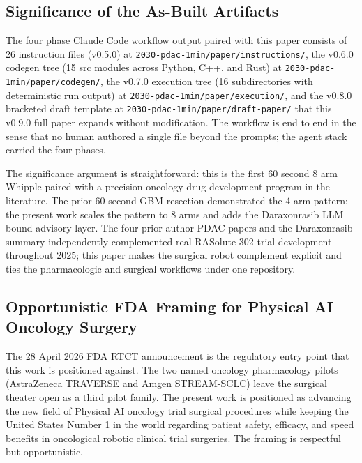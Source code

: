 
\subsection{Significance of the As-Built Artifacts}
\label{sec:discussion-significance}

The four phase Claude Code workflow output paired with this paper
consists of 26 instruction files (v0.5.0) at
\texttt{2030-pdac-1min/paper/instructions/}, the v0.6.0 codegen
tree (15 src modules across Python, C++, and Rust) at
\texttt{2030-pdac-1min/paper/codegen/}, the v0.7.0 execution tree
(16 subdirectories with deterministic run output) at
\texttt{2030-pdac-1min/paper/execution/}, and the v0.8.0 bracketed
draft template at \texttt{2030-pdac-1min/paper/draft-paper/} that
this v0.9.0 full paper expands without modification. The workflow
is end to end in the sense that no human authored a single file
beyond the prompts; the agent stack \cite{claude-code,
claude-opus-47, claude-sonnet-46} carried the four phases.

The significance argument is straightforward: this is the first 60
second 8 arm Whipple paired with a precision oncology drug
development program in the literature. The prior 60 second GBM
resection \cite{kawchak_2026_20113157} demonstrated the 4 arm
pattern; the present work scales the pattern to 8 arms and adds
the Daraxonrasib LLM bound advisory layer. The four prior author
PDAC papers \cite{kawchak_2025_15735068, kawchak_2025_16415815,
kawchak_2025_17001137, kawchak_2025_17239510} and the Daraxonrasib
summary \cite{kawchak_2025_18099351} independently complemented
real RASolute 302 trial development throughout 2025; this paper
makes the surgical robot complement explicit and ties the
pharmacologic and surgical workflows under one repository.

\subsection{Opportunistic FDA Framing for Physical AI Oncology Surgery}
\label{sec:discussion-fda}

The 28 April 2026 FDA RTCT announcement \cite{fda2026realtime} is
the regulatory entry point that this work is positioned against.
The two named oncology pharmacology pilots (AstraZeneca TRAVERSE
and Amgen STREAM-SCLC) leave the surgical theater open as a third
pilot family. The present work is positioned as advancing the new
field of Physical AI oncology trial surgical procedures while
keeping the United States Number 1 in the world regarding patient
safety, efficacy, and speed benefits in oncological robotic
clinical trial surgeries. The framing is respectful but
opportunistic.

